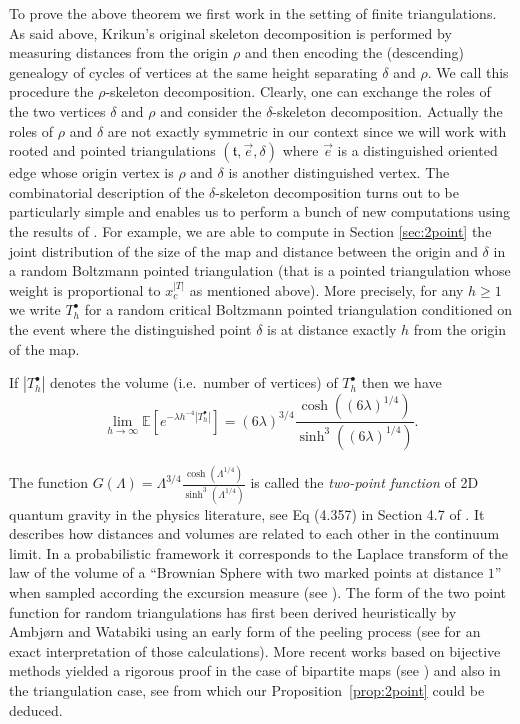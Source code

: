 \documentclass[10pt]{amsart}
\theoremstyle{definition}\newtheorem{defi}[theo]{Definition}\newtheorem{rema}[theo]{Remark}\newtheorem{exam}[theo]{Example}\newtheorem{exem}[theo]{Example}\newtheorem{nota}[theo]{Notation}
\begin{document}
To prove the above theorem we first work in the setting of finite triangulations. As said above, Krikun's original skeleton decomposition is performed by measuring distances from the origin $\rho$ and then encoding the (descending) genealogy of cycles of vertices at the same height separating $\delta$ and $\rho$. We call this procedure the $\rho$-skeleton decomposition. Clearly, one can exchange the roles of the two vertices $\delta$ and $\rho$ and consider the $\delta$-skeleton decomposition. Actually the roles of $\rho$ and $\delta$ are not exactly symmetric in our context since we will work with rooted and pointed triangulations $( \mathfrak{t}, \vec{e}, \delta)$ where $\vec{e}$ is a distinguished oriented edge whose origin vertex is $\rho$ and $\delta$ is another distinguished vertex. The combinatorial description of the $\delta$-skeleton decomposition turns out to be particularly simple and enables us to perform a bunch of new computations using the results of \cite{M}.
For example, we are able to compute in Section \ref{sec:2point} the joint distribution of the size of the map and distance between the origin and $\delta$  in a random Boltzmann pointed triangulation (that is a pointed triangulation whose weight is proportional to $x_c^{|T|}$ as mentioned above). More precisely, for any $h \geq 1$ we write $T_{h}^{\bullet}$ for a random critical Boltzmann pointed triangulation conditioned on the event where the distinguished point $\delta$ is at distance exactly $h$ from the origin of the map.
\begin{proposition}
\label{prop:2point}
If $|T^{\bullet}_{h}|$ denotes the volume (i.e.~number of vertices) of $T^{\bullet}_{h}$ then we have
$$ \lim_{h\to \infty} \mathbb{E}\left[ e^{-\lambda h^{-4} |T^{\bullet}_{h}|} \right] =(6\lambda) ^{3/4} \frac{\cosh((6\lambda)^{1/4})}{\sinh^{3}( (6\lambda) ^{1/4})}.$$
\end{proposition}
The function $G(\Lambda) = \Lambda ^{3/4} \frac{\cosh(\Lambda^{1/4})}{\sinh^{3}( \Lambda ^{1/4})}$ is called the \emph{two-point function} of 2D quantum gravity in the physics literature, see Eq (4.357) in Section 4.7 of \cite{ADJ}. It describes how distances and volumes are related to each other in the continuum limit. In a probabilistic framework it corresponds to the Laplace transform of the law of the volume of a ``Brownian Sphere with two marked points at distance $1$'' when sampled according the excursion measure (see  \cite[Proposition 4.6]{CLG16}).  The form of the two point function for random triangulations has first been derived heuristically by Ambj\o rn and Watabiki using an early form of the peeling process \cite{AW} (see \cite{AB14} for an exact interpretation of those calculations). More recent works based on bijective methods yielded a rigorous proof in the case of bipartite maps (see \cite{BDFG03,BG12,DF05}) and also in the triangulation case, see \cite[Section 6.1]{BG12} from which our Proposition~\ref{prop:2point}
 could be deduced.
\end{document}
